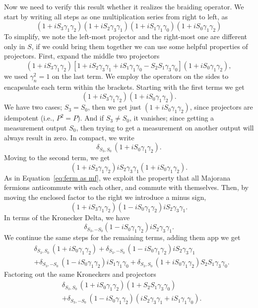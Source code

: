 \documentclass{article}
\begin{document}
Now we need to verify this result whether it realizes the braiding operator. We start by writing all steps as one multiplication series from right to left, as
\[
	(1 + iS_3 \gamma_1 \gamma_2) (1 + iS_2 \gamma_3 \gamma_1) (1 + iS_1 \gamma_1 \gamma_0) (1 + iS_0 \gamma_1 \gamma_2)
\]
To simplify, we note the left-most projector and the right-most one are different only in $ S $, if we could bring them together we can use some helpful properties of projectors. First, expand the middle two projectors
\[
	(1 + iS_3 \gamma_1 \gamma_2)
	[1 + iS_2 \gamma_3 \gamma_1 + iS_1 \gamma_1 \gamma_0 - S_2 S_1 \gamma_3 \gamma_0]
	(1 + iS_0 \gamma_1 \gamma_2),
\]
we used $ \gamma_n^2 = 1 $ on the last term. We employ the operators on the sides to encapsulate each term within the brackets. Starting with the first terms we get
\[
	(1 + iS_3 \gamma_1 \gamma_2) (1 + iS_0 \gamma_1 \gamma_2).
\]
We have two cases; $ S_3 = S_0 $, then we get just $ (1 + iS_0 \gamma_1 \gamma_2) $, since projectors are idempotent (i.e., $ P^2 = P $). And if $ S_3 \ne S_0 $, it vanishes; since getting a measurement output $ S_0 $, then trying to get a measurement on another output will always result in zero. In compact, we write
\[
	\delta_{S_3, S_0} \, (1 + iS_0 \gamma_1 \gamma_2).
\]
Moving to the second term, we get
\[
	(1 + iS_3 \gamma_1 \gamma_2) iS_2 \gamma_3 \gamma_1 (1 + iS_0 \gamma_1 \gamma_2).
\]
As in Equation~\ref{eq:ferm as mf}, we exploit the property that all Majorana fermions anticommute with each other, and commute with themselves. Then, by moving the enclosed factor to the right we introduce a minus sign,
\[
	(1 + iS_3 \gamma_1 \gamma_2)(1 - iS_0 \gamma_1 \gamma_2) iS_2 \gamma_3 \gamma_1 .
\]
In terms of the Kronecker Delta, we have
\[
	\delta_{S_3, -S_0}(1 - iS_0 \gamma_1 \gamma_2)iS_2 \gamma_3 \gamma_1 .
\]
We continue the same steps for the remaining terms, adding them app we get
\[
	\begin{aligned}
		 & \delta_{S_3, S_0} \, (1 + iS_0 \gamma_1 \gamma_2)
		+\delta_{S_3, -S_0}\, (1 - iS_0 \gamma_1 \gamma_2)iS_2 \gamma_3 \gamma_1    \\
		 & +\delta_{S_3, -S_0}\, (1 - iS_0 \gamma_1 \gamma_2)iS_1 \gamma_1 \gamma_0
		+\delta_{S_3, S_0}\, (1 + iS_0 \gamma_1 \gamma_2)S_2 S_1 \gamma_3 \gamma_0 .
	\end{aligned}
\]
Factoring out the same Kroneckers and projectors
\begin{equation}
	\begin{aligned}
		 & \delta_{S_3, S_0} \, (1 + iS_0 \gamma_1 \gamma_2)  ( 1 + S_2 S_1 \gamma_3 \gamma_0 )                    \\
		 & +\delta_{S_3, -S_0} \, (1 - iS_0 \gamma_1 \gamma_2) ( iS_2 \gamma_3 \gamma_1 +iS_1 \gamma_1 \gamma_0) .
	\end{aligned}
	\label{eq:seq 8 mfs}
\end{equation}
\end{document}
